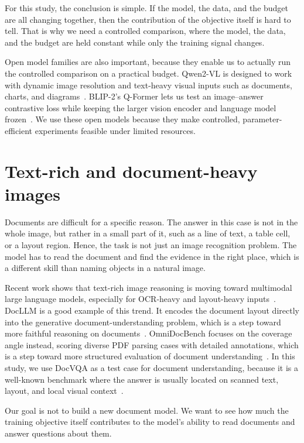 For this study, the conclusion is simple.
If the model, the data, and the budget are all changing together, then the contribution of the objective itself is hard to tell.
That is why we need a controlled comparison, where the model, the data, and the budget are held constant while only the training signal changes.

Open model families are also important, because they enable us to actually run the controlled comparison on a practical budget.
Qwen2-VL is designed to work with dynamic image resolution and text-heavy visual inputs such as documents, charts, and diagrams~\cite{wang2024qwen2vl}.
BLIP-2's Q-Former lets us test an image--answer contrastive loss while keeping the larger vision encoder and language model frozen~\cite{li2023blip2}.
We use these open models because they make controlled, parameter-efficient experiments feasible under limited resources.

\section{Text-rich and document-heavy images}
Documents are difficult for a specific reason.
The answer in this case is not in the whole image, but rather in a small part of it, such as a line of text, a table cell, or a layout region.
Hence, the task is not just an image recognition problem.
The model has to read the document and find the evidence in the right place, which is a different skill than naming objects in a natural image.

Recent work shows that text-rich image reasoning is moving toward multimodal large language models, especially for OCR-heavy and layout-heavy inputs~\cite{fu2025textrichsurvey}.
DocLLM is a good example of this trend. It encodes the document layout directly into the generative document-understanding problem,
which is a step toward more faithful reasoning on documents~\cite{wang2024docllm}.
OmniDocBench focuses on the coverage angle instead, scoring diverse PDF parsing cases with detailed annotations,
which is a step toward more structured evaluation of document understanding~\cite{ouyang2025omnidocbench}.
In this study, we use DocVQA as a test case for document understanding, because it is a well-known benchmark 
where the answer is usually located on scanned text, layout, and local visual context~\cite{mathew2021docvqa}.

Our goal is not to build a new document model.
We want to see how much the training objective itself contributes to the model's ability to read documents and answer questions about them.

